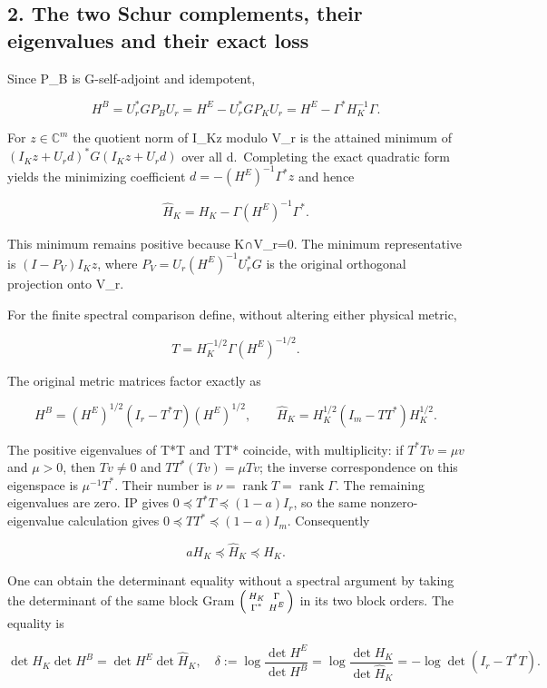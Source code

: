 \subsection{2. The two Schur complements, their eigenvalues and their exact loss}\label{the-two-schur-complements-their-eigenvalues-and-their-exact-loss}

Since P\_B is G-self-adjoint and idempotent,

\[
H^B=U_r^*GP_BU_r
=H^E-U_r^*GP_KU_r
=H^E-\Gamma^*H_K^{-1}\Gamma. \tag{F3}
\]

For \(z\in\mathbb C^m\) the quotient norm of I\_Kz modulo V\_r is the attained minimum of \((I_Kz+U_rd)^*G(I_Kz+U_rd)\) over all d.~Completing the exact quadratic form yields the minimizing coefficient \(d=-(H^E)^{-1}\Gamma^*z\) and hence

\[
\widehat H_K=H_K-\Gamma(H^E)^{-1}\Gamma^*. \tag{F4}
\]

This minimum remains positive because K∩V\_r=0. The minimum representative is \((I-P_V)I_Kz\), where \(P_V=U_r(H^E)^{-1}U_r^*G\) is the original orthogonal projection onto V\_r.

For the finite spectral comparison define, without altering either physical metric,

\[
T=H_K^{-1/2}\Gamma(H^E)^{-1/2}.
\]

The original metric matrices factor exactly as

\[
H^B=(H^E)^{1/2}(I_r-T^*T)(H^E)^{1/2},\qquad
\widehat H_K=H_K^{1/2}(I_m-TT^*)H_K^{1/2}.
\]

The positive eigenvalues of T*T and TT* coincide, with multiplicity: if \(T^*Tv=\mu v\) and \(\mu>0\), then \(Tv\ne0\) and \(TT^*(Tv)=\mu Tv\); the inverse correspondence on this eigenspace is \(\mu^{-1}T^*\). Their number is \(\nu=\operatorname{rank}T=\operatorname{rank}\Gamma\). The remaining eigenvalues are zero. IP gives \(0\preceq T^*T\preceq(1-a)I_r\), so the same nonzero-eigenvalue calculation gives \(0\preceq TT^*\preceq(1-a)I_m\). Consequently

\[
aH_K\preceq\widehat H_K\preceq H_K. \tag{F5}
\]

One can obtain the determinant equality without a spectral argument by taking the determinant of the same block Gram \(\begin{psmallmatrix}H_K&\Gamma\\\Gamma^*&H^E\end{psmallmatrix}\) in its two block orders. The equality is

\[
\det H_K\det H^B=\det H^E\det\widehat H_K,
\quad
\delta:=\log\frac{\det H^E}{\det H^B}
=\log\frac{\det H_K}{\det\widehat H_K}
=-\log\det(I_r-T^*T). \tag{F6}
\]

